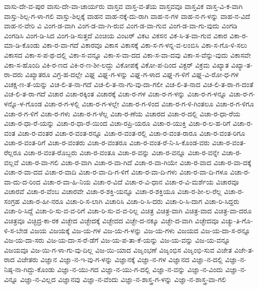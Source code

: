 {ವಾಸು-ದೇ-ವ-ಪುರ
ವಾಸು-ದೇ-ವಾ-ಚಾರ್ಯರು
ವಾಸ್ತವ
ವಾಸ್ತ-ವ-ತೆಯ
ವಾಸ್ತವವೂ
ವಾಸ್ತವಿಕ
ವಾಸ್ತ-ವಿ-ಕ-ವಾಗಿ
ವಾಸ್ತು-ಶಿಲ್ಪ-ಗ-ಳಾ-ಗಲಿ
ವಾಸ್ತು-ಶಿಲ್ಪಕ್ಕೆ
ವಾಹನ
ವಾಹ-ನಕ್ಕೆ-ದು-ರಾಗಿ
ವಾಹ-ನ-ಗಳ
ವಾಹ-ನ-ಗ-ಳನ್ನು
ವಾಹ-ನ-ವಿದೆ
ವಾಹ-ನ-ವೇರಿ
ವಿ
ವಿಂಗ-ಡ-ವಾಗಿ
ವಿಂಗ-ಡ-ವಾ-ಗಿ-ರುವ
ವಿಂಗ-ಡ-ವಾ-ಗುವ
ವಿಂಗ-ಡ-ವಾ-ಗು-ವುದು
ವಿಂಗಡಿ
ವಿಂಗಡಿಸಿ
ವಿಂಗ-ಡಿ-ಸಿದ
ವಿಂಗ-ಡಿ-ಸುತ್ತದೆ
ವಿಂಚಿಯ
ವಿಂಟರ್
ವಿಕಟ
ವಿಕಸನ
ವಿಕ-ಸಿ-ತ-ವಾ-ಗುವ
ವಿಕಾರ
ವಿಕಾ-ರ-ಮಾ-ಡಿ-ಕೊಂಡು
ವಿಕಾ-ರ-ವಾ-ಗದೆ
ವಿಕಾರವೂ
ವಿಕಾಸ
ವಿಕಾಸಕ್ಕೆ
ವಿಕಾ-ಸ-ಗ-ಳನ್ನ-ವ-ಲಂಬಿಸಿ
ವಿಕಾ-ಸ-ಗೊ-ಳಿ-ಸಲು
ವಿಕಾಸದ
ವಿಕಾ-ಸ-ಪ-ಥ-ದಲ್ಲಿ
ವಿಕಾ-ಸ-ವನ್ನೂ
ವಿಕಾ-ಸ-ವಾ-ದದ
ವಿಕಾ-ಸ-ವಾ-ದವು
ವಿಕಾ-ಸ-ವೆನ್ನು-ವುದು
ವಿಕಾಸವೇ
ವಿಕಾ-ಸ-ಹೊಂದಿ
ವಿಕಿ-ರ-ಣದ
ವಿಕಿ-ರ-ಣ-ಶೀ-ಲದ್ದು
ವಿಕೋಪಕ್ಕೆ
ವಿಕೋ-ಪ-ದಿಂದ
ವಿಕ್ಟರ್
ವಿಕ್ರಮ
ವಿಖ್ಯಾತ
ವಿಖ್ಯಾ-ತ-ರಾ-ದರು
ವಿಖ್ಯಾತರೂ
ವಿಗ್ರ-ಹ-ದಲ್ಲೇ
ವಿಘ್ನ
ವಿಘ್ನ-ಗ-ಳನ್ನು
ವಿಘ್ನ-ಗ-ಳಾದ
ವಿಘ್ನ-ಗ-ಳಿಗೆ
ವಿಘ್ನ-ವಿ-ರೋ-ಧ-ಗಳ
ವಿಚಕ್ಷ-ಣ-ತೆ-ಯನ್ನು
ವಿಚ-ಲಿ-ತ-ನಾ-ಗದೆ
ವಿಚ-ಲಿ-ತ-ನಾ-ಗು-ವು-ದಾ-ಗಲೀ
ವಿಚ-ಲಿ-ತ-ನಾದ
ವಿಚ-ಲಿ-ತ-ರಾ-ಗ-ದಂತೆ
ವಿಚ-ಲಿ-ತ-ರಾ-ಗದೆ
ವಿಚಾರ
ವಿಚಾ-ರಕ್ಕಿಂತ
ವಿಚಾರಕ್ಕೆ
ವಿಚಾ-ರ-ಗಳ
ವಿಚಾ-ರ-ಗ-ಳನ್ನು
ವಿಚಾ-ರ-ಗ-ಳನ್ನೂ
ವಿಚಾ-ರ-ಗ-ಳನ್ನೊ-ಳ-ಗೊಂಡ
ವಿಚಾ-ರ-ಗ-ಳಲ್ಲಿ
ವಿಚಾ-ರ-ಗ-ಳಲ್ಲೇ
ವಿಚಾ-ರ-ಗ-ಳಿಂದ
ವಿಚಾ-ರ-ಗ-ಳಿ-ಗಿಂತಲೂ
ವಿಚಾ-ರ-ಗ-ಳಿಗೂ
ವಿಚಾ-ರ-ಗ-ಳಿಗೆ
ವಿಚಾ-ರ-ಗಳು
ವಿಚಾ-ರ-ಗ-ಳೆಲ್ಲ
ವಿಚಾ-ರ-ಣೆಯ
ವಿಚಾರದ
ವಿಚಾ-ರ-ದಲ್ಲಿ
ವಿಚಾ-ರ-ಧಾ-ರೆಯ
ವಿಚಾ-ರ-ಧಾ-ರೆ-ಯನ್ನು
ವಿಚಾ-ರ-ಧಾ-ರೆ-ಯಿಂದ
ವಿಚಾ-ರಪ್ರಿ-ಯರೂ
ವಿಚಾ-ರ-ಯುಕ್ತಿ
ವಿಚಾ-ರ-ಲ-ಹ-ರಿಗೆ
ವಿಚಾ-ರ-ವಂತ
ವಿಚಾ-ರ-ವಂತರ
ವಿಚಾ-ರ-ವಂತ-ರನ್ನೂ
ವಿಚಾ-ರ-ವಂತ-ರಲ್ಲಿ
ವಿಚಾ-ರ-ವಂತ-ರಾರೂ
ವಿಚಾ-ರ-ವಂತ-ರಿಗೂ
ವಿಚಾ-ರ-ವಂತ-ರಿಗೆ
ವಿಚಾ-ರ-ವಂತರು
ವಿಚಾ-ರ-ವಂತರೂ
ವಿಚಾ-ರ-ವಂತ-ರೆ-ನಿ-ಸಿ-ಕೊಂಡ-ವರು
ವಿಚಾ-ರ-ವಂತ-ರೆಲ್ಲರೂ
ವಿಚಾ-ರ-ವಂತ-ರೊಬ್ಬರು
ವಿಚಾ-ರ-ವಂತೂ
ವಿಚಾ-ರ-ವನ್ನು
ವಿಚಾ-ರ-ವನ್ನೂ
ವಿಚಾ-ರ-ವನ್ನೇ
ವಿಚಾ-ರ-ವಲ್ಲವೆ
ವಿಚಾ-ರ-ವಾ-ಗಲಿ
ವಿಚಾ-ರ-ವಾಗಿ
ವಿಚಾ-ರ-ವಾ-ಗಿದೆ
ವಿಚಾ-ರ-ವಾ-ಗಿಯೇ
ವಿಚಾ-ರ-ವಾದ
ವಿಚಾ-ರ-ವಾ-ದಕ್ಕೆ
ವಿಚಾ-ರ-ವಾ-ದದ
ವಿಚಾ-ರ-ವಾದಿ
ವಿಚಾ-ರ-ವಾ-ದಿ-ಗ-ಳಿಗೆ
ವಿಚಾ-ರ-ವಾ-ದಿ-ಗಳು
ವಿಚಾ-ರ-ವಾ-ದಿ-ಗಳೂ
ವಿಚಾ-ರ-ವಾ-ದು-ದ-ರಿಂದ
ವಿಚಾ-ರ-ವಾ-ಹಿ-ನಿಯ
ವಿಚಾ-ರ-ವಿದೆ
ವಿಚಾ-ರ-ವಿ-ಧಾನ
ವಿಚಾ-ರ-ವಿ-ಮರ್ಶೆಯ
ವಿಚಾರವೂ
ವಿಚಾರವೆ
ವಿಚಾ-ರ-ವೆಂಬ
ವಿಚಾರವೇ
ವಿಚಾ-ರ-ಶಕ್ತಿ-ಯನ್ನೂ
ವಿಚಾ-ರ-ಶಕ್ತಿಯೂ
ವಿಚಾ-ರ-ಶೀ-ಲ-ರೆಲ್ಲ
ವಿಚಾ-ರ-ಸಂಗ್ರಹ
ವಿಚಾ-ರ-ಹೀ-ನರೂ
ವಿಚಾ-ರಿ-ಸ-ಲಾಗಿ
ವಿಚಾರಿಸಿ
ವಿಚಾ-ರಿ-ಸಿ-ದರು
ವಿಚಾ-ರಿ-ಸಿ-ದಾಗ
ವಿಚಾ-ರಿ-ಸಿದ್ದರು
ವಿಚಾ-ರಿ-ಸಿದ್ದೆ
ವಿಚಾ-ರಿ-ಸು-ವ-ವ-ರಿಗೆ
ವಿಚಾ-ರಿ-ಸು-ವ-ವ-ರಿಲ್ಲ
ವಿಚಿತ್ರ
ವಿಚಿತ್ರ-ವಾಗಿ
ವಿಚಿತ್ರ-ವಾದ
ವಿಚಿತ್ರ-ವಾ-ದರೂ
ವಿಚಿತ್ರವೂ
ವಿಚ್ಛಿದ್ರ-ಕಾ-ರಕ
ವಿಚ್ಛೇದ
ವಿಚ್ಛೇದಕ್ಕೆ
ವಿಚ್ಛೇದದ
ವಿಚ್ಛೇ-ದ-ನಕ್ಕೂ
ವಿಚ್ಛೇ-ದ-ವಾಗಿ
ವಿಚ್ಛೇದವೂ
ವಿಚ್ಯು-ತಿ-ಗೊ-ಳಿ-ಸ-ಬೇಡ
ವಿಜಯ
ವಿಜಯಕ್ಕೆ
ವಿಜ-ಯ-ಗಳ
ವಿಜ-ಯ-ಗ-ಳನ್ನು
ವಿಜ-ಯ-ಗಳು
ವಿಜಯದ
ವಿಜ-ಯ-ದಾ-ಸ-ರನ್ನೂ
ವಿಜ-ಯ-ದಾ-ಸರು
ವಿಜ-ಯ-ದಾ-ಸ-ರೆ-ಡೆಗೆ
ವಿಜ-ಯ-ಪ-ತಾ-ಕೆ-ಯನ್ನು
ವಿಜ-ಯ-ವನ್ನು
ವಿಜ-ಯ-ವನ್ನೂ
ವಿಜಯವೂ
ವಿಜ-ಯಿ-ಗ-ಳಾ-ಗು-ವು-ದಿಲ್ಲ
ವಿಜ-ಯಿ-ಯಾದ
ವಿಜೃಂಭಣೆ
ವಿಜೃಂಭಿಸ
ವಿಜೃಂಭಿ-ಸುವ
ವಿಜೇತ
ವಿಜೇ-ತ-ರಾದ
ವಿಜೇತರು
ವಿಜ್ಞಾನ
ವಿಜ್ಞಾ-ನ-ಇ-ವು-ಗ-ಳನ್ನು
ವಿಜ್ಞಾನಕ್ಕೆ
ವಿಜ್ಞಾ-ನ-ಗಳ
ವಿಜ್ಞಾನದ
ವಿಜ್ಞಾ-ನ-ದಲ್ಲಿ
ವಿಜ್ಞಾ-ನ-ನಿಷ್ಠ-ನಾ-ಗಿದ್ದು-ಕೊಂಡು
ವಿಜ್ಞಾ-ನ-ಯು-ಗದ
ವಿಜ್ಞಾ-ನ-ಯು-ಗ-ದಲ್ಲಿ
ವಿಜ್ಞಾ-ನ-ವನ್ನು
ವಿಜ್ಞಾ-ನ-ವಿಂದು
ವಿಜ್ಞಾ-ನ-ವಿನ್ನೂ
ವಿಜ್ಞಾ-ನ-ವಿಲ್ಲದ
ವಿಜ್ಞಾನವು
ವಿಜ್ಞಾ-ನ-ವೆಂದು
ವಿಜ್ಞಾ-ನ-ಶಾಸ್ತ್ರ-ಗ-ಳನ್ನು
ವಿಜ್ಞಾ-ನ-ಶಾಸ್ತ್ರ-ವಾ-ಗಲಿ
}
